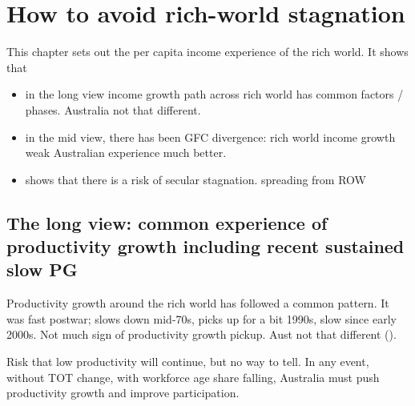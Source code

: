 \chapter{How to avoid rich-world stagnation} \label{chap1} %

This chapter sets out the per capita income experience of the rich world. It shows that 

\begin{itemize}
    \item in the long view income growth path across rich world has common factors / phases. Australia not that different. 
    \item in the mid view, there has been GFC divergence: rich world income growth weak Australian experience much better.
    \item shows that there is a risk of secular stagnation. spreading from ROW 
\end{itemize} 


\section{The long view: common experience of productivity growth including recent sustained slow PG}

Productivity growth around the rich world has followed a common pattern. It was fast postwar; slows down mid-70s, picks up for a bit 1990s, slow since early 2000s. Not much sign of productivity growth pickup. Aust not that different ().

Risk that low productivity will continue, but no way to tell. In any event, without TOT change, with workforce age share falling, Australia must push productivity growth and improve participation. 

